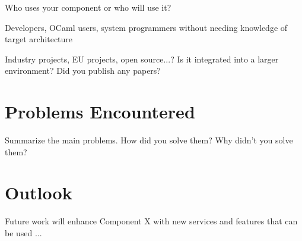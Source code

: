 Who uses your component or who will use it?

Developers, OCaml users, system programmers
without needing knowledge of target architecture


Industry projects, EU projects, open source...? Is it integrated into a larger environment? Did you publish any papers?

\section{Problems Encountered\label{sec:problems}}

Summarize the main problems. How did you solve them? Why didn't you solve them?

\section{Outlook\label{sec:outlook}}

Future work will enhance Component X with new services and features that can be used ...
